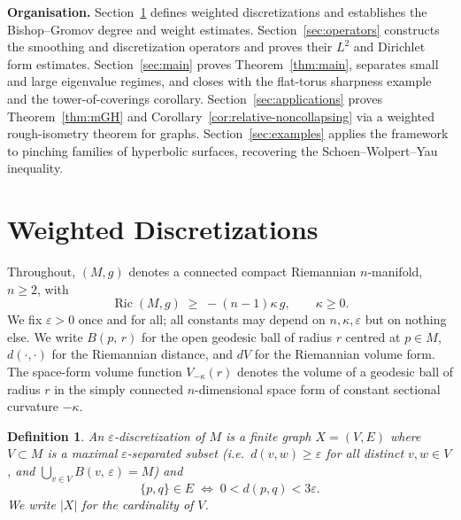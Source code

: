 \documentclass[10pt,reqno]{amsart}
\newtheorem{definition}[theorem]{Definition}
\theoremstyle{remark}
\newcommand{\Ric}{\operatorname{Ric}}
\newcommand{\Vk}{V_{-\kappa}}
\newcommand{\B}[2]{B(#1,\,#2)}
\begin{document}
\medskip
\noindent\textbf{Organisation.}
Section~\ref{sec:setup} defines weighted discretizations and
establishes the Bishop--Gromov degree and weight estimates.
Section~\ref{sec:operators} constructs the smoothing and
discretization operators and proves their $L^2$ and Dirichlet form
estimates. Section~\ref{sec:main} proves Theorem~\ref{thm:main},
separates small and large eigenvalue regimes, and closes with the
flat-torus sharpness example and the tower-of-coverings corollary.
Section~\ref{sec:applications} proves Theorem~\ref{thm:mGH} and
Corollary~\ref{cor:relative-noncollapsing} via a weighted
rough-isometry theorem for graphs. Section~\ref{sec:examples} applies the
framework to pinching families of hyperbolic surfaces, recovering the
Schoen--Wolpert--Yau inequality.

\section{Weighted Discretizations}
\label{sec:setup}

Throughout, $(M,g)$ denotes a connected compact Riemannian $n$-manifold,
$n\geq 2$, with
\begin{equation}
\label{eq:ricci}
  \Ric(M,g)\;\geq\;-(n-1)\kappa\,g,
  \qquad\kappa\geq 0.
\end{equation}
We fix $\varepsilon>0$ once and for all; all constants may depend on
$n,\kappa,\varepsilon$ but on nothing else.
We write $\B{p}{r}$ for the open geodesic ball of radius $r$ centred at
$p\in M$, $d(\cdot,\cdot)$ for the Riemannian distance, and $dV$ for the
Riemannian volume form.
The space-form volume function $\Vk(r)$ denotes the volume of a geodesic
ball of radius $r$ in the simply connected $n$-dimensional space form of
constant sectional curvature $-\kappa$.

\begin{definition}
\label{def:disc}
An \emph{$\varepsilon$-discretization} of $M$ is a finite graph $X=(V,E)$
where $V\subset M$ is a maximal $\varepsilon$-separated subset
(i.e.\ $d(v,w)\geq\varepsilon$ for all distinct $v,w\in V$, and
$\bigcup_{v\in V}\B{v}{\varepsilon}=M$) and
\[
  \{p,q\}\in E
  \;\iff\;
  0<d(p,q)<3\varepsilon.
\]
We write $|X|$ for the cardinality of $V$.
\end{definition}
\end{document}
